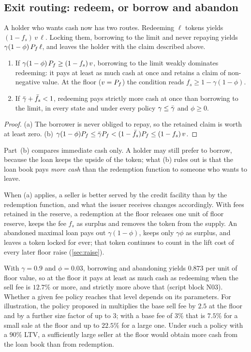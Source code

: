 \subsection{Exit routing: redeem, or borrow and abandon}

A holder who wants cash now has two routes. Redeeming $\ell$ tokens yields $(1-f_s)\,v\,\ell$. Locking them, borrowing to the limit and never repaying yields $\gamma(1-\phi)\,P_f\,\ell$, and leaves the holder with the claim described above.

\begin{proposition}\label{prop:route}
\begin{enumerate}[label=(\alph*)]
\item If $\gamma(1-\phi)\,P_f\ge(1-f_s)\,v$, borrowing to the limit weakly dominates redeeming: it pays at least as much cash at once and retains a claim of non-negative value. At the floor ($v=P_f$) the condition reads $f_s\ge 1-\gamma(1-\phi)$.
\item If $\bar\gamma+\bar f_s<1$, redeeming pays strictly more cash at once than borrowing to the limit, in every state and under every policy $\gamma\le\bar\gamma$ and $\phi\ge0$.
\end{enumerate}
\end{proposition}
\begin{proof}
(a) The borrower is never obliged to repay, so the retained claim is worth at least zero. (b) $\gamma(1-\phi)P_f\le\bar\gamma P_f<(1-\bar f_s)P_f\le(1-f_s)\,v$.
\end{proof}

Part~(b) compares immediate cash only. A holder may still prefer to borrow, because the loan keeps the upside of the token; what (b) rules out is that the loan book pays \emph{more cash} than the redemption function to someone who wants to leave.

When (a) applies, a seller is better served by the credit facility than by the redemption function, and what the issuer receives changes accordingly. With fees retained in the reserve, a redemption at the floor releases one unit of floor reserve, keeps the fee $f_s$ as surplus and removes the token from the supply. An abandoned maximal loan pays out $\gamma(1-\phi)$, keeps only $\gamma\phi$ as surplus, and leaves a token locked for ever; that token continues to count in the lift cost of every later floor raise (\cref{sec:raise}).

With $\gamma=0.9$ and $\phi=0.03$, borrowing and abandoning yields $0.873$ per unit of floor value, so at the floor it pays at least as much cash as redeeming when the sell fee is $12.7\%$ or more, and strictly more above that (script block N03). Whether a given fee policy reaches that level depends on its parameters. For illustration, the policy proposed in \vone{} multiplies the base sell fee by $2.5$ at the floor and by a further size factor of up to $3$; with a base fee of $3\%$ that is $7.5\%$ for a small sale at the floor and up to $22.5\%$ for a large one. Under such a policy with a $90\%$ LTV, a sufficiently large seller at the floor would obtain more cash from the loan book than from redemption.


